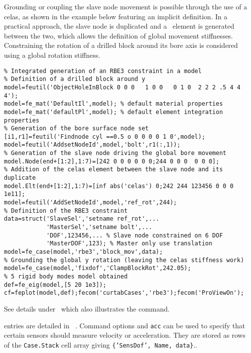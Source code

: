 Grounding or coupling the slave node movement is possible through the use of a celas, as shown in the example below featuring an implicit  definition. In a practical approach, the slave node is duplicated and a \celas\ element is generated between the two, which allows the definition of global movement stiffnesses.  Constraining the rotation of a drilled block around its bore axis is considered using a global rotation stiffness.

\begin{verbatim}
% Integrated generation of an RBE3 constraint in a model
% Definition of a drilled block around y
model=feutil('ObjectHoleInBlock 0 0 0   1 0 0   0 1 0  2 2 2 .5 4 4 4'); 
model=fe_mat('DefaultIl',model); % default material properties
model=fe_mat('defaultPl',model); % default element integration properties
% Generation of the bore surface node set
[i1,r1]=feutil('Findnode cyl ==0.5 o 0 0 0 0 1 0',model);
model=feutil('AddsetNodeId',model,'bolt',r1(:,1));
% Generation of the slave node driving the global bore movement
model.Node(end+[1:2],1:7)=[242 0 0 0 0 0 0;244 0 0 0  0 0 0];
% Addition of the celas element between the slave node and its duplicate
model.Elt(end+[1:2],1:7)=[inf abs('celas') 0;242 244 123456 0 0 0 1e11];
model=feutil('AddSetNodeId',model,'ref_rot',244);
% Definition of the RBE3 constraint
data=struct('SlaveSel','setname ref_rot',...
            'MasterSel','setname bolt',...
            'DOF',123456,... % Slave node constrained on 6 DOF
            'MasterDOF',123); % Master only use translation
model=fe_case(model,'rbe3','block_mov',data);
% Grounding the global y rotation (leaving the celas stiffness work)
model=fe_case(model,'fixdof','ClampBlockRot',242.05);
% 5 rigid body modes model obtained
def=fe_eig(model,[5 20 1e3]);
cf=feplot(model,def);fecom('curtabCases','rbe3');fecom('ProViewOn');
\end{verbatim}%



See details under \rigid\ which also illustrates the  command.


 entries are detailed in ~. Command options  and {\tt acc} can be used to specify that certain sensors should measure velocity or acceleration. They are stored as rows of the {\tt Case.Stack} cell array giving {\tt \{'SensDof', Name, data\}}.. 

